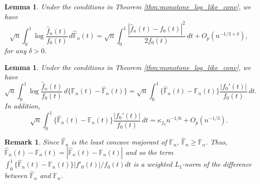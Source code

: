 \documentclass[12pt,letterpaper, twoside, openany]{article}
\theoremstyle{plain}
\newtheorem{lemma}[theorem]{Lemma}
\newtheorem{remark}[theorem]{Remark}
\begin{document}
\begin{lemma}\label{lem:KL_weighted_L2error}
Under the conditions in Theorem \ref{thm:monotone_log_like_conv}, we have
\begin{equation*}\label{eq:KL_become_L2}
	\sqrt{n}\int_0^1 \log \frac{\hat{f}_n(t)}{f_0(t)} \,d\hat{\mathbb{F}}_n(t)
	= \sqrt{n}\int_0^1 \frac{|\hat{f}_n(t) - f_0(t)|^2}{2f_0(t)} \,dt + O_p(n^{-1/3 + \delta}),
\end{equation*}
for any $\delta > 0$.
\end{lemma}

\begin{lemma}\label{lem:KL_minus_log_like}
Under the conditions in Theorem \ref{thm:monotone_log_like_conv}, we have
\begin{equation*}
	\sqrt{n}\int_0^1 \log \frac{\hat{f}_n(t)}{f_0(t)} \,d\{\mathbb{F}_n(t)-\hat{\mathbb{F}}_n(t)\}
	=  \sqrt{n}\int_0^1 \{\hat{\mathbb{F}}_n(t) - \mathbb{F}_n(t)\} \frac{|f_0'(t)|}{f_0(t)}\,dt.
\end{equation*}
In addition, 
\begin{equation*}
	\sqrt{n}\int_0^1 \{\hat{\mathbb{F}}_n(t) - \mathbb{F}_n(t)\} \frac{|f_0'(t)|}{f_0(t)}\,dt = \kappa_{f_0}n^{-1/6} + O_p(n^{-1/3}).
\end{equation*}
\end{lemma}
\begin{remark}
Since $\hat{\mathbb{F}}_n$ is the least concave majorant of $\mathbb{F}_n$, $\hat{\mathbb{F}}_n \geq \mathbb{F}_n$. Thus, $\hat{\mathbb{F}}_n(t) - \mathbb{F}_n(t) = |\hat{\mathbb{F}}_n(t) - \mathbb{F}_n(t)|$ and so the term $\int^1_0 \{\hat{\mathbb{F}}_n(t) - \mathbb{F}_n(t) \} |f'_0(t)|/f_0(t) dt$ is a weighted $L_1$-norm of the difference between $\hat{\mathbb{F}}_n$ and $\mathbb{F}_n$.
\end{remark}
\end{document}
